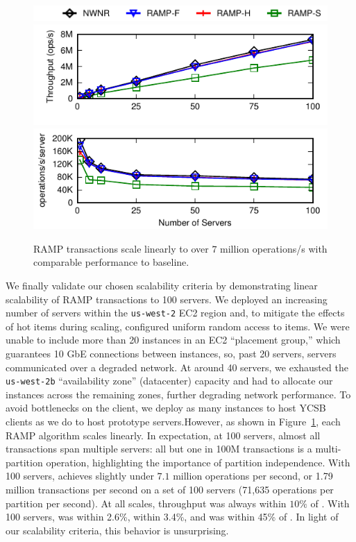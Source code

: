 \begin{figure}[th!]
\begin{center}
\hspace{5mm}\includegraphics[width=\defaultfigwidth]{figs/legend-scaleout.pdf}\vspace{-.5em}
\includegraphics[width=.65\columnwidth]{figs/ns-thru.pdf}\vspace{-1.5em}
\includegraphics[width=.65\columnwidth]{figs/ns-perserver-thru.pdf}
\end{center}
\caption{RAMP transactions scale linearly to over $7$ million
  operations/s with comparable performance to \nwnr baseline.}
\label{fig:scaleout}
\end{figure}


We finally validate our chosen scalability criteria by demonstrating
linear scalability of RAMP transactions to 100 servers. We deployed an
increasing number of servers within the \texttt{us-west-2} EC2 region
and, to mitigate the effects of hot items during scaling, configured
uniform random access to items. We were unable to include more than 20
instances in an EC2 ``placement group,'' which guarantees 10 GbE
connections between instances, so, past 20 servers, servers
communicated over a degraded network. At around 40 servers, we
exhausted the \texttt{us-west-2b} ``availability zone'' (datacenter)
capacity and had to allocate our instances across the remaining zones,
further degrading network performance. To avoid bottlenecks on the
client, we deploy as many instances to host YCSB clients as we do to
host prototype servers.However, as shown in Figure~\ref{fig:scaleout},
each RAMP algorithm scales linearly. In expectation, at 100 servers,
almost all transactions span multiple servers: all but one in 100M
transactions is a multi-partition operation, highlighting the
importance of partition independence. With 100 servers, \rapl achieves
slightly under $7.1$ million operations per second, or 1.79 million
transactions per second on a set of 100 servers (71,635 operations
per partition per second). At all scales, \rapl throughput was always
within $10\%$ of \nwnr. With 100 servers, \rapl was within 2.6\%,
\raps within 3.4\%, and \raps was within 45\% of \nwnr. In light of
our scalability criteria, this behavior is unsurprising.

\FloatBarrier
